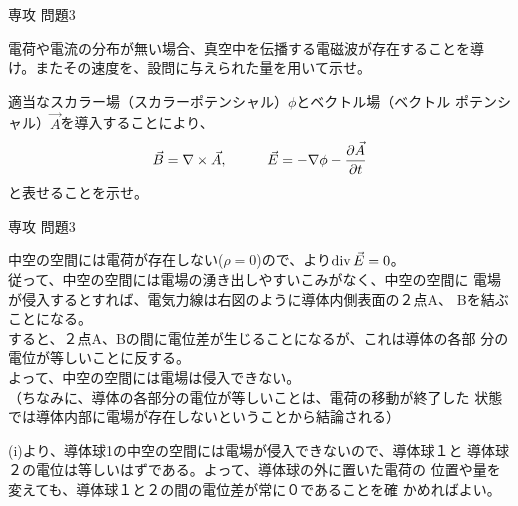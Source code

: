\documentclass[fleqn]{jbook}
\begin{document}
\begin{question}{専攻 問題3}{}
\begin{subquestions}
\begin{subsubquestions}
  \SubSubQuestion
  電荷や電流の分布が無い場合、真空中を伝播する電磁波が存在することを導
  け。またその速度を、設問に与えられた量を用いて示せ。
  \end{subsubquestions}

\SubQuestion
  適当なスカラー場（スカラーポテンシャル）$\phi$とベクトル場（ベクトル
  ポテンシャル）$\vec{A}$を導入することにより、
  \[
    \vec{B} = \nabla \times \vec{A} , \hspace{10mm}
    \vec{E} = - \nabla \phi - \frac { \partial \vec{A} } { \partial t }
  \]
  と表せることを示せ。

\end{subquestions}

\end{question}
\begin{answer}{専攻 問題3}{}

\begin{subanswers}
\SubAnswer
  \begin{subsubanswers}
  \SubSubAnswer
    \parbox[t]{100mm}{
   中空の空間には電荷が存在しない($\rho=0$)ので、より${\rm div\,}\vec{E}=0
   $。\\
   従って、中空の空間には電場の湧き出しやすいこみがなく、中空の空間に
   電場が侵入するとすれば、電気力線は右図のように導体内側表面の２点A、
   Bを結ぶことになる。\\
   すると、２点A、Bの間に電位差が生じることになるが、これは導体の各部
   分の電位が等しいことに反する。\\
   よって、中空の空間には電場は侵入できない。\\
   （ちなみに、導体の各部分の電位が等しいことは、電荷の移動が終了した
   状態では導体内部に電場が存在しないということから結論される）
   
    
    
  \SubSubAnswer
   
   (i)より、導体球1の中空の空間には電場が侵入できないので、導体球１と
   導体球２の電位は等しいはずである。よって、導体球の外に置いた電荷の
   位置や量を変えても、導体球１と２の間の電位差が常に０であることを確
   かめればよい。}
   \parbox[t]{50mm}{
   
}
\end{subsubanswers}
\end{subanswers}
\end{answer}
\end{document}
